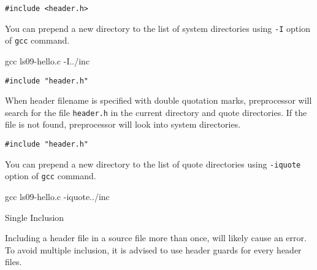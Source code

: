\documentclass[compress]{beamer}
\begin{document}
\begin{slide}
	\begin{block}{\texttt{\#include <header.h>}}

	You can prepend a new directory to the list of system directories using \texttt{-I} option of \texttt{gcc} command.

	\begin{terminal}
	gcc ls09-hello.c -I../inc
	\end{terminal}

	\end{block}
\end{slide}

\begin{slide}
	\begin{block}{\texttt{\#include "header.h"}}

	When header filename is specified with double quotation marks, preprocessor will search for the file \texttt{header.h} in the current directory and quote directories.
	If the file is not found, preprocessor will look into system directories.

	\end{block}
\end{slide}

\begin{slide}
	\begin{block}{\texttt{\#include "header.h"}}

	You can prepend a new directory to the list of quote directories using \texttt{-iquote} option of \texttt{gcc} command.

	\begin{terminal}
	gcc ls09-hello.c -iquote../inc
	\end{terminal}

	\end{block}
\end{slide}

\begin{slide}
	\begin{block}{Single Inclusion}

	Including a header file in a source file more than once, will likely cause an error.
	To avoid multiple inclusion, it is advised to use header guards for every header files.

	\inputminted[fontsize=\footnotesize, firstline=10, linenos]{c}{
		\resDirectory/header.h
	}

	\end{block}
\end{slide}
\end{document}
